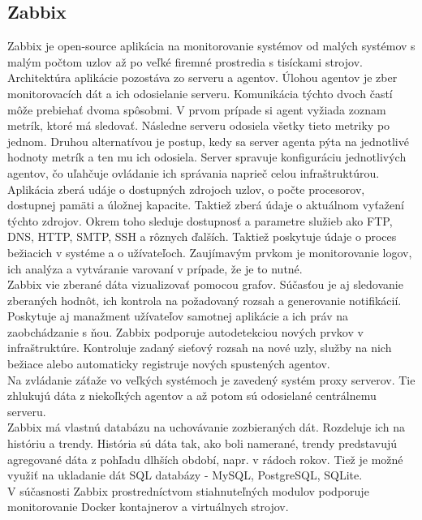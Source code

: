 \documentclass[printed,11pt,twoside,color,cover,table]{fithesis3}
\begin{document}
\subsection{Zabbix}
Zabbix je open-source aplikácia na monitorovanie systémov od malých systémov s malým počtom uzlov až po veľké firemné prostredia s tisíckami strojov. Architektúra aplikácie pozostáva zo serveru a agentov.
Úlohou agentov je zber monitorovacích dát a ich odosielanie serveru. Komunikácia týchto dvoch častí môže prebiehať dvoma spôsobmi. V prvom prípade si agent vyžiada zoznam metrík, ktoré má sledovať. Následne 
serveru odosiela všetky tieto metriky po jednom. Druhou alternatívou je postup, kedy sa server agenta pýta na jednotlivé hodnoty metrík a ten mu ich odosiela. Server spravuje konfiguráciu jednotlivých agentov,
čo uľahčuje ovládanie ich správania naprieč celou infraštruktúrou.
\\Aplikácia zberá udáje o dostupných zdrojoch uzlov, o počte procesorov, dostupnej pamäti a úložnej kapacite. Taktiež zberá údaje o aktuálnom vyťažení týchto zdrojov. Okrem toho sleduje dostupnosť a parametre
služieb ako FTP, DNS, HTTP, SMTP, SSH a rôznych ďalších. Taktiež poskytuje údaje o proces bežiacich v systéme a o užívateľoch. Zaujímavým prvkom je monitorovanie logov, ich analýza a vytváranie varovaní 
v prípade, že je to nutné.
\\Zabbix vie zberané dáta vizualizovať pomocou grafov. Súčasťou je aj sledovanie zberaných hodnôt, ich kontrola na požadovaný rozsah a generovanie notifikácií. Poskytuje aj manažment užívateľov samotnej 
aplikácie a ich práv na zaobchádzanie s ňou. Zabbix podporuje autodetekciou nových prvkov v infraštruktúre. Kontroluje zadaný sieťový rozsah na nové uzly, služby na nich bežiace alebo automaticky registruje
nových spustených agentov.
\\Na zvládanie záťaže vo veľkých systémoch je zavedený systém proxy serverov. Tie zhlukujú dáta z niekoľkých agentov a až potom sú odosielané centrálnemu serveru.
\\Zabbix má vlastnú databázu na uchovávanie zozbieraných dát. Rozdeluje ich na históriu a trendy. História sú dáta tak, ako boli namerané, trendy predstavujú agregované dáta z pohľadu dlhších období, napr. v 
rádoch rokov. Tiež je možné využiť na ukladanie dát SQL databázy - MySQL, PostgreSQL, SQLite.
\\V súčasnosti Zabbix prostredníctvom stiahnuteľných modulov podporuje monitorovanie Docker kontajnerov a virtuálnych strojov.
\end{document}
